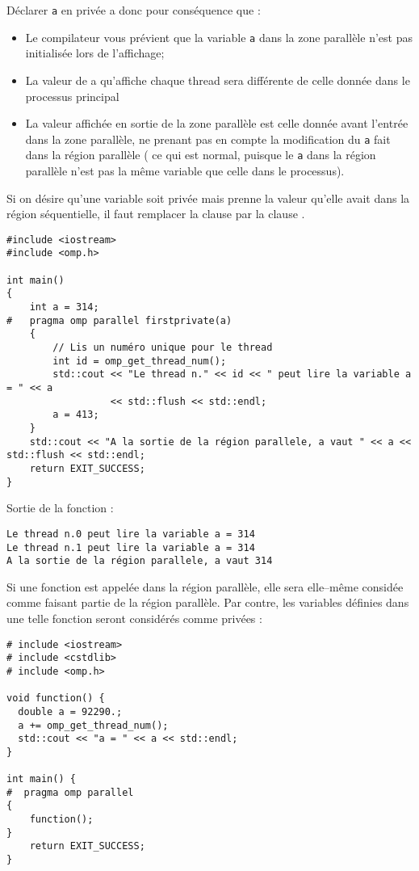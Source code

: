 \documentclass[fleqn,11pt]{article}
\begin{document}
Déclarer \texttt{a} en privée a donc pour conséquence que :
\begin{itemize}
  \item Le compilateur vous prévient que la variable \texttt{a} dans la zone parallèle n'est pas initialisée
  lors de l'affichage;
  \item La valeur de a qu'affiche chaque thread sera différente de celle donnée dans le processus principal
  \item La valeur affichée en sortie de la zone parallèle est celle donnée avant l'entrée dans la zone parallèle, ne prenant pas en compte la modification du \texttt{a} fait dans la région parallèle ( ce qui est normal, puisque le \texttt{a} dans la région parallèle n'est pas la même variable que celle dans le processus).
\end{itemize}


Si on désire qu'une variable soit privée mais prenne la valeur qu'elle avait dans la région séquentielle, il faut remplacer la clause \lstinline@private@ par la clause \lstinline@firstprivate@.

\begin{lstlisting}
#include <iostream>
#include <omp.h>

int main()
{
    int a = 314;
#   pragma omp parallel firstprivate(a)
    {
        // Lis un numéro unique pour le thread
        int id = omp_get_thread_num();
        std::cout << "Le thread n." << id << " peut lire la variable a = " << a 
                  << std::flush << std::endl;
        a = 413;
    }
    std::cout << "A la sortie de la région parallele, a vaut " << a << std::flush << std::endl;
    return EXIT_SUCCESS;
}
\end{lstlisting}

Sortie de la fonction :
\begin{verbatim}
Le thread n.0 peut lire la variable a = 314
Le thread n.1 peut lire la variable a = 314
A la sortie de la région parallele, a vaut 314
\end{verbatim}

Si une fonction est appelée dans la région parallèle, elle sera elle--même considée comme faisant partie de la
région parallèle. Par contre, les variables définies dans une telle fonction seront considérés comme privées :

\begin{lstlisting}
# include <iostream>
# include <cstdlib>
# include <omp.h>

void function() {
  double a = 92290.;
  a += omp_get_thread_num();
  std::cout << "a = " << a << std::endl;
}

int main() {
#  pragma omp parallel
{
    function();
}
    return EXIT_SUCCESS;
}
\end{lstlisting}
\end{document}
